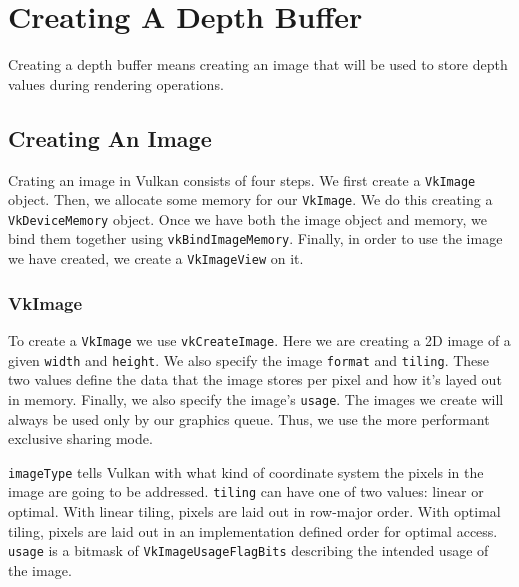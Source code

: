 \section{Creating A Depth Buffer}

Creating a depth buffer means creating an image that will
be used to store depth values during rendering operations.

\subsection{Creating An Image}

Crating an image in Vulkan consists of four steps.
We first create a \texttt{VkImage} object.
Then, we allocate some memory for our \texttt{VkImage}.
We do this creating a \texttt{VkDeviceMemory} object.
Once we have both the image object and memory, we bind
them together using \texttt{vkBindImageMemory}.
Finally, in order to use the image we have created, we
create a \texttt{VkImageView} on it.

\subsubsection{VkImage}

To create a \texttt{VkImage} we use \texttt{vkCreateImage}.
Here we are creating a 2D image of a given \texttt{width}
and \texttt{height}.
We also specify the image \texttt{format} and \texttt{tiling}.
These two values define the data that the image stores per pixel
and how it's layed out in memory.
Finally, we also specify the image's \texttt{usage}.
The images we create will always be used only by our graphics queue.
Thus, we use the more performant exclusive sharing mode.

\begin{minipage}{\linewidth}{\noindent}
    
\end{minipage}

\texttt{imageType} tells Vulkan with what kind of coordinate
system the pixels in the image are going to be addressed.
\texttt{tiling} can have one of two values: linear or optimal.
With linear tiling, pixels are laid out in row-major order.
With optimal tiling, pixels are laid out in an implementation
defined order for optimal access.
\texttt{usage} is a bitmask of \texttt{VkImageUsageFlagBits}
describing the intended usage of the image.

